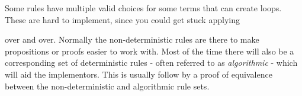 \begin{frame}[c,shrink=20]
  \begin{mdframed}[frametitle={A non-deterministic set of rules}]
    \begin{columns}
      \begin{column}{0.5\textwidth}
      \end{column}
      \begin{column}{0.5\textwidth}
      \end{column}
    \end{columns}
  \end{mdframed}

  \medskip

  \begin{overprint}
  \onslide<+>
  Some rules have multiple valid choices for some terms that can create loops.
  \onslide<+>
  These are hard to implement, since you could get stuck applying


  over and over.
  \onslide<+>
  Normally the non-deterministic rules are there to make propositions or proofs easier to work with.
  \onslide<+>
  Most of the time there will also be a corresponding set of deterministic rules - often referred to as {\it algorithmic} - which will aid the implementors.
  \onslide<+>
  This is usually follow by a proof of equivalence between the non-deterministic and algorithmic rule sets.
  \end{overprint}
\end{frame}

